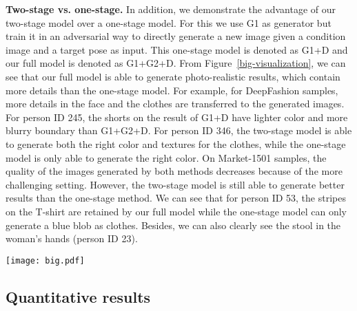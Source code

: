 \documentclass{article}
\newcommand{\myparagraph}[1]{\vspace{0.0em}\noindent\textbf{#1}}
\begin{document}
\myparagraph{Two-stage vs. one-stage.} 
In addition, we demonstrate the advantage of our two-stage model over a one-stage model. For this we use G1 as generator but train it in an adversarial way to directly generate a new image given a condition image and a target pose as input. This one-stage model is denoted as G1+D and our full model is denoted as G1+G2+D.
From Figure~\ref{big-visualization}, we can see that our full model is able to generate photo-realistic results, which contain more details than the one-stage model. For example, for DeepFashion samples, more details in the face and the clothes are transferred to the generated images. For person ID 245, the shorts on the result of G1+D have
lighter color and more blurry boundary than G1+G2+D. For person ID 346, the two-stage model is able to generate both the right color and textures for the clothes, while the one-stage model is only able to generate the right color.
On Market-1501 samples, the quality of the images generated by both methods decreases because of the more challenging setting. However, the two-stage model is still able to generate better results than the one-stage method. We can see that for person ID 53, the stripes on the T-shirt are retained by our full model while the one-stage model can only generate a blue blob as clothes. Besides, we can also clearly see the stool in the woman's hands (person ID 23).

\begin{figure*}[htp]
  \centering
  \texttt{[image: big.pdf]}\\
\caption{Test results on DeepFashion (upper 3 rows, images are cut for the sake of display) and Market-1501 dataset (lower 3 rows). We test G1 in two aspects: (1) three pose embedding methods, i.e., coordinate embedding (CE), heatmap embedding (HME) and our pose heatmap concatenation in G1-L1, and (2) two losses, i.e., the proposed poseMaskLoss and the standard L1 loss. Column 7, 8 and 9 show the differences among our stage-I (G1), one-stage adversarial model (G1+D) and our two-stage adversarial model (G1+G2+D). Note that all three use poseMaskLoss. The IDs are assigned randomly when splitting the datasets.}
  \label{big-visualization}
\end{figure*}






 

\vspace{-1mm}
\subsection{Quantitative results}
\vspace{-1mm}
\end{document}
